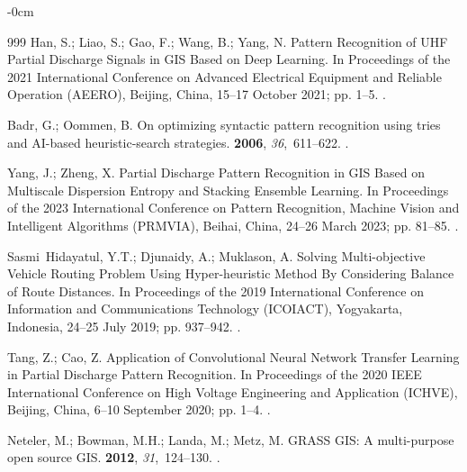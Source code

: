 \documentclass[jimaging,article,accept,pdftex,moreauthors]{Definitions/mdpi}
\begin{document}
\begin{adjustwidth}{-\extralength}{0cm}
\begin{thebibliography}{999}
Han, S.; Liao, S.; Gao, F.; Wang, B.; Yang, N.
\newblock Pattern Recognition of UHF Partial Discharge Signals in GIS Based on
  Deep Learning.
\newblock In Proceedings of the 2021 International Conference on Advanced
  Electrical Equipment and Reliable Operation (AEERO),   Beijing, China, 15--17 October 2021; pp. 1--5.
.

Badr, G.; Oommen, B.
\newblock On optimizing syntactic pattern recognition using tries and AI-based
  heuristic-search strategies.
 {\bf 2006}, {\em 36},~611--622.
.

Yang, J.; Zheng, X.
\newblock Partial Discharge Pattern Recognition in GIS Based on Multiscale
  Dispersion Entropy and Stacking Ensemble Learning.
\newblock In Proceedings of the 2023 International Conference on Pattern
  Recognition, Machine Vision and Intelligent Algorithms (PRMVIA),  Beihai, China, 24--26 March 2023; pp.
  81--85.
.

Sasmi~Hidayatul, Y.T.; Djunaidy, A.; Muklason, A.
\newblock Solving Multi-objective Vehicle Routing Problem Using Hyper-heuristic
  Method By Considering Balance of Route Distances.
\newblock In Proceedings of the 2019 International Conference on Information
  and Communications Technology (ICOIACT),  Yogyakarta, Indonesia,  24--25 July 2019; pp. 937--942.
.

Tang, Z.; Cao, Z.
\newblock Application of Convolutional Neural Network Transfer Learning in
  Partial Discharge Pattern Recognition.
\newblock In Proceedings of the 2020 IEEE International Conference on High
  Voltage Engineering and Application (ICHVE),  Beijing, China, 6--10 September 2020; pp. 1--4.
.

Neteler, M.; Bowman, M.H.; Landa, M.; Metz, M.
\newblock GRASS GIS: A multi-purpose open source GIS.
 {\bf 2012}, {\em
  31},~124--130.
.


\end{thebibliography}
\end{adjustwidth}
\end{document}
